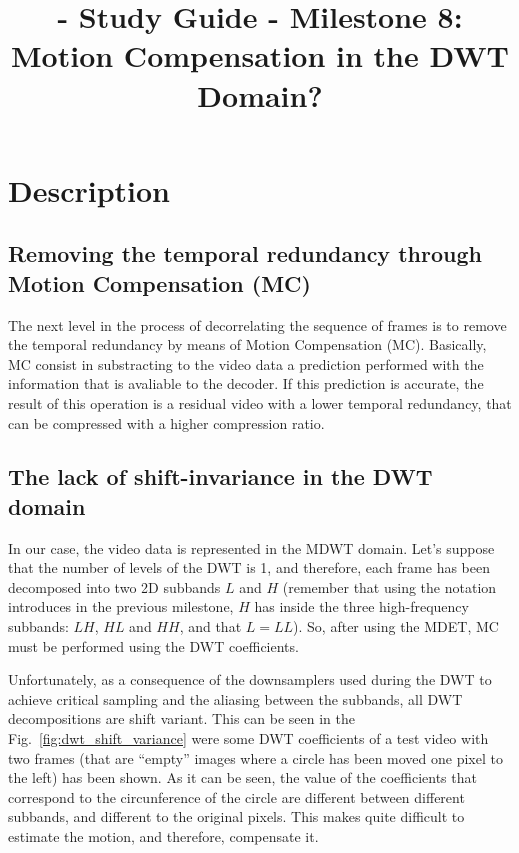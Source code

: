 
\title{\SM{} - Study Guide - Milestone 8: Motion Compensation in the DWT Domain?}

\maketitle

\section{Description}

\subsection{Removing the temporal redundancy through Motion Compensation (MC)}
The next level in the process of decorrelating the sequence of frames
is to remove the temporal redundancy by means of Motion Compensation
(MC). Basically, MC consist in substracting to the video data a
prediction performed with the information that is avaliable to the
decoder. If this prediction is accurate, the result of this operation
is a residual video with a lower temporal redundancy, that can be
compressed with a higher compression ratio.

\subsection{The lack of shift-invariance in the DWT domain}
In our case, the video data is represented in the MDWT domain. Let's
suppose that the number of levels of the DWT is 1, and therefore, each
frame has been decomposed into two 2D subbands $L$ and $H$ (remember
that using the notation introduces in the previous milestone, $H$ has
inside the three high-frequency subbands: $LH$, $HL$ and $HH$, and
that $L=LL$). So, after using the MDET, MC must be performed using the
DWT coefficients.

Unfortunately, as a consequence of the downsamplers used during the
DWT to achieve critical sampling and the aliasing between the
subbands, all DWT decompositions are shift variant. This can be seen
in the Fig.~\ref{fig:dwt_shift_variance} were some DWT coefficients of
a test video with two frames (that are ``empty'' images where a circle
has been moved one pixel to the left) has been shown. As it can be
seen, the value of the coefficients that correspond to the
circunference of the circle are different between different subbands,
and different to the original pixels. This makes quite difficult to
estimate the motion, and therefore, compensate it.

